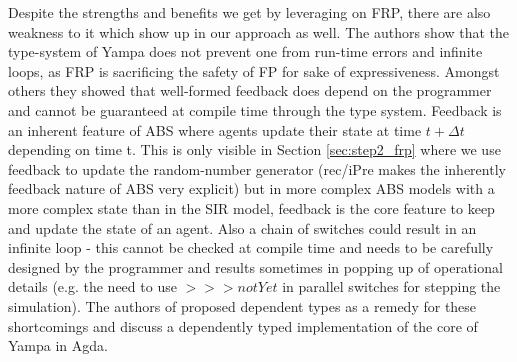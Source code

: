 Despite the strengths and benefits we get by leveraging on FRP, there are also weakness to it which show up in our approach as well. The authors \cite{sculthorpe_safe_2009} show that the type-system of Yampa does not prevent one from run-time errors and infinite loops, as FRP is sacrificing the safety of FP for sake of expressiveness. Amongst others they showed that well-formed feedback does depend on the programmer and cannot be guaranteed at compile time through the type system. Feedback is an inherent feature of ABS where agents update their state at time $t + \Delta t$ depending on time t. This is only visible in Section \ref{sec:step2_frp} where we use feedback to update the random-number generator (rec/iPre makes the inherently feedback nature of ABS very explicit) but in more complex ABS models with a more complex state than in the SIR model, feedback is the core feature to keep and update the state of an agent. Also a chain of switches could result in an infinite loop - this cannot be checked at compile time and needs to be carefully designed by the programmer and results sometimes in popping up of operational details (e.g. the need to use $>>> notYet$ in parallel switches for stepping the simulation). The authors of \cite{sculthorpe_safe_2009} proposed dependent types as a remedy for these shortcomings and discuss a dependently typed implementation of the core of Yampa in Agda.

\begin{comment}
Also having a two layer (arrows and pure functions) language in Yampa \cite{jeffrey_causality_2013} and three a layer (arrows, monadic and pure functions) language in Dunai / BearRiver adds expressivity and power but can make things quite complex already in the simple SIR example. Fortunately with a more complex model the complexity in this context does not increase - in the end it is the price we need to pay for the high expressivity which functions like \textit{occasionally} provide.
\end{comment}

